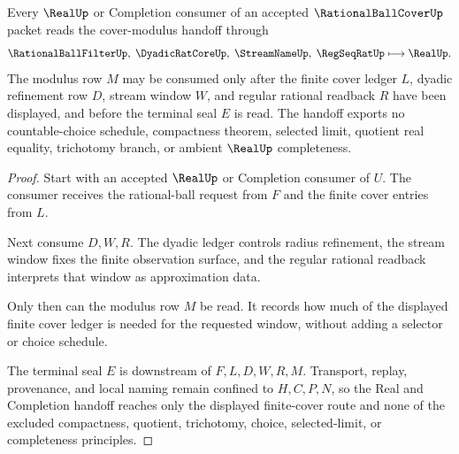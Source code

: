\begin{theorem}
\label{thm:choice-free-rational-ball-cover-modulus}
Every $\RealUp$ or Completion consumer of an accepted $\RationalBallCoverUp$ packet reads the cover-modulus handoff through
$$
\RationalBallFilterUp,\;\DyadicRatCoreUp,\;\StreamNameUp,\;\RegSeqRatUp
\longmapsto
\RealUp .
$$
The modulus row $M$ may be consumed only after the finite cover ledger $L$, dyadic refinement row $D$, stream window $W$, and regular rational readback $R$ have been displayed, and before the terminal seal $E$ is read. The handoff exports no countable-choice schedule, compactness theorem, selected limit, quotient real equality, trichotomy branch, or ambient $\RealUp$ completeness.
\end{theorem}
\begin{proof}
Start with an accepted $\RealUp$ or Completion consumer of $U$. The consumer receives the rational-ball request from $F$ and the finite cover entries from $L$.

Next consume $D,W,R$. The dyadic ledger controls radius refinement, the stream window fixes the finite observation surface, and the regular rational readback interprets that window as approximation data.

Only then can the modulus row $M$ be read. It records how much of the displayed finite cover ledger is needed for the requested window, without adding a selector or choice schedule.

The terminal seal $E$ is downstream of $F,L,D,W,R,M$. Transport, replay, provenance, and local naming remain confined to $H,C,P,N$, so the Real and Completion handoff reaches only the displayed finite-cover route and none of the excluded compactness, quotient, trichotomy, choice, selected-limit, or completeness principles.
\end{proof}



